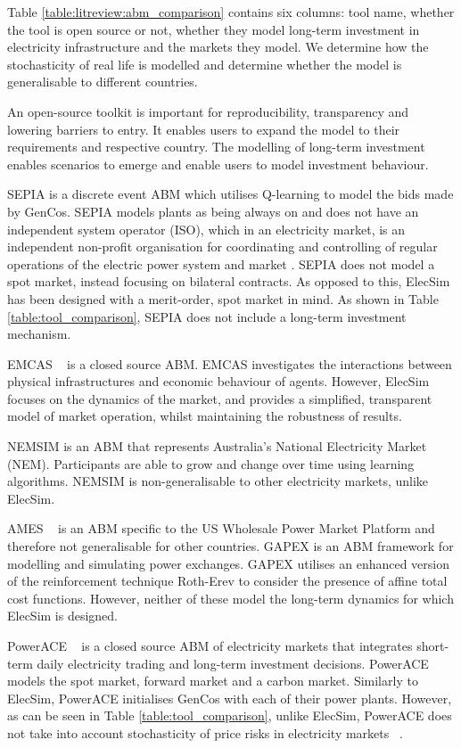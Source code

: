 Table \ref{table:litreview:abm_comparison} contains six columns: tool name, whether the tool is open source or not, whether they model long-term investment in electricity infrastructure and the markets they model. We determine how the stochasticity of real life is modelled and determine whether the model is generalisable to different countries. 


An open-source toolkit is important for reproducibility, transparency and lowering barriers to entry. It enables users to expand the model to their requirements and respective country. The modelling of long-term investment enables scenarios to emerge and enable users to model investment behaviour. 

SEPIA \cite{Harp2000} is a discrete event ABM which utilises Q-learning to model the bids made by GenCos. SEPIA models plants as being always on and does not have an independent system operator (ISO), which in an electricity market, is an independent non-profit organisation for coordinating and controlling of regular operations of the electric power system and market \cite{Zhou2007}. SEPIA does not model a spot market, instead focusing on bilateral contracts. As opposed to this, ElecSim has been designed with a merit-order, spot market in mind. As shown in Table \ref{table:tool_comparison}, SEPIA does not include a long-term investment mechanism. 

EMCAS ~\cite{Conzelmann} is a closed source ABM. EMCAS investigates the interactions between physical infrastructures and economic behaviour of agents. However, ElecSim focuses on the dynamics of the market, and provides a simplified, transparent model of market operation, whilst maintaining the robustness of results.

NEMSIM \cite{Grozev2005} is an ABM that represents Australia's National Electricity Market (NEM). Participants are able to grow and change over time using learning algorithms. NEMSIM is non-generalisable to other electricity markets, unlike ElecSim.

AMES ~\cite{Sun2007} is an ABM specific to the US Wholesale Power Market Platform and therefore not generalisable for other countries. GAPEX \cite{Cincotti2013} is an ABM framework for modelling and simulating power exchanges. GAPEX utilises an enhanced version of the reinforcement technique Roth-Erev \cite{RothAE1995} to consider the presence of affine total cost functions. However, neither of these model the long-term dynamics for which ElecSim is designed.

PowerACE ~\cite{Rothengatter2007} is a closed source ABM of electricity markets that integrates short-term daily electricity trading and long-term investment decisions. PowerACE models the spot market, forward market and a carbon market. Similarly to ElecSim, PowerACE initialises GenCos with each of their power plants. However, as can be seen in Table \ref{table:tool_comparison}, unlike ElecSim, PowerACE does not take into account stochasticity of price risks in electricity markets ~\cite{Most2010}.

